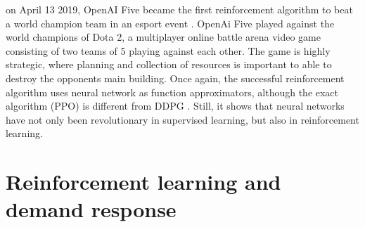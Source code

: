 \documentclass[class=book, crop=false]{standalone}
\begin{document}
on April 13 2019, OpenAI Five became the first reinforcement algorithm to beat a world champion team in an esport event \cite{openai_dota}. OpenAi Five played against the world champions of Dota 2, a multiplayer online battle arena video game consisting of two teams of 5 playing against each other. The game is highly strategic, where planning and collection of resources is important to able to destroy the opponents main building. Once again, the successful reinforcement algorithm uses neural network as function approximators, although the exact algorithm (PPO) is different from DDPG \cite{PPO_openAI_Schulman}. Still, it shows that neural networks have not only been revolutionary in supervised learning, but also in reinforcement learning. 



\section{Reinforcement learning and demand response}
\end{document}
